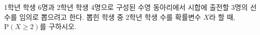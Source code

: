 1학년 학생 6명과 2학년 학생 4명으로 구성된 수영 동아리에서 시합에 출전할 3명의 선수를 임의로 뽑으려고 한다. 뽑힌 학생 중 2학년 학생 수를 확률변수 $X$라 할 때, $\mathrm{P}(X\ge 2)$를 구하시오.
